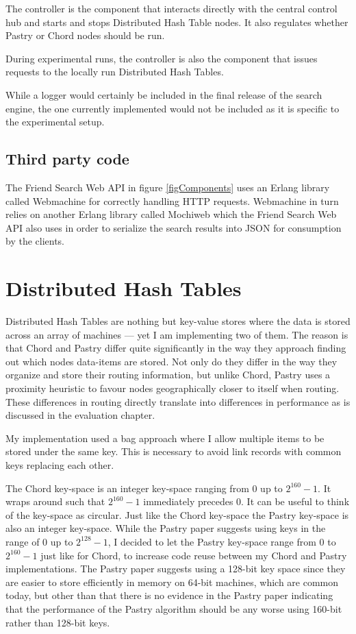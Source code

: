 The controller is the component that interacts directly with the central control hub and starts and stops Distributed Hash Table nodes. It also regulates whether Pastry or Chord nodes should be run.

During experimental runs, the controller is also the component that issues requests to the locally run Distributed Hash Tables.

While a logger would certainly be included in the final release of the search engine, the one currently implemented would not be included as it is specific to the experimental setup.

\subsection{Third party code}
The Friend Search Web API in figure \ref{figComponents} uses an Erlang library called Webmachine for correctly handling HTTP requests. Webmachine in turn relies on another Erlang library called Mochiweb which the Friend Search Web API also uses in order to serialize the search results into JSON for consumption by the clients.

\section{Distributed Hash Tables}
Distributed Hash Tables are nothing but key-value stores where the data is stored across an array of machines --- yet I am implementing two of them. The reason is that Chord and Pastry differ quite significantly in the way they approach finding out which nodes data-items are stored. Not only do they differ in the way they organize and store their routing information, but unlike Chord, Pastry uses a proximity heuristic to favour nodes geographically closer to itself when routing. These differences in routing directly translate into differences in performance as is discussed in the evaluation chapter.

My implementation used a bag approach where I allow multiple items to be stored under the same key. This is necessary to avoid link records with common keys replacing each other.

The Chord key-space is an integer key-space ranging from 0 up to $2^{160} - 1$. It wraps around such that $2^{160} - 1$ immediately precedes 0. It can be useful to think of the key-space as circular. Just like the Chord key-space the Pastry key-space is also an integer key-space. While the Pastry paper \cite{pastry} suggests using keys in the range of 0 up to $2^{128} - 1$, I decided to let the Pastry key-space range from 0 to $2^{160} - 1$ just like for Chord, to increase code reuse between my Chord and Pastry implementations.
The Pastry paper suggests using a 128-bit key space since they are easier to store efficiently in memory on 64-bit machines, which are common today, but other than that there is no evidence in the Pastry paper \cite{pastry} indicating that the performance of the Pastry algorithm should be any worse using 160-bit rather than 128-bit keys.

